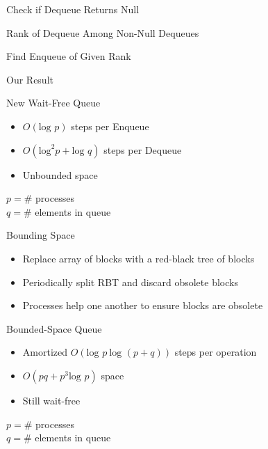 \documentclass[compress]{beamer}
\newcommand{\op}[1]{\mbox{\sc #1}}
\renewcommand{\log}{\mbox{log }} %
\begin{document}
\begin{frame}{Check if \op{Dequeue} Returns Null}

\vfill


\end{frame}


\begin{frame}{Rank of \op{Dequeue} Among Non-Null \op{Dequeues}}
%

\vfill


\end{frame}

\begin{frame}{Find \op{Enqueue} of Given Rank}


\vfill


\end{frame}

\begin{frame}{Our Result}

\begin{block}{New Wait-Free Queue}
\begin{itemize}
\item $O(\log p)$ steps per \op{Enqueue}
\item $O(\mbox{log}^2 p + \log q)$ steps per \op{Dequeue}
\item<2> Unbounded space
\end{itemize}
\end{block}

$p = \#$ processes\\
$q = \#$ elements in queue
\end{frame}

\begin{frame}{Bounding Space}

\begin{itemize}
\item Replace array of blocks with a red-black tree of blocks
\item Periodically split RBT and discard obsolete blocks
\item Processes  help one another to ensure blocks are obsolete
\end{itemize}

\begin{block}{Bounded-Space Queue}
\begin{itemize}
\item Amortized $O(\log p\ \log(p+q))$ steps per operation
\item $O(pq+p^3\log p)$ space
\item Still wait-free
\end{itemize}
\end{block}

$p = \#$ processes\\
$q = \#$ elements in queue

\end{frame}
\end{document}
